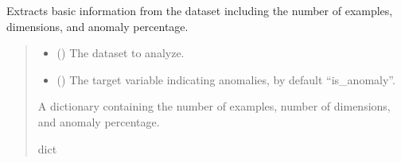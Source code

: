 \documentclass[letterpaper,10pt,english]{sphinxmanual}
\begin{document}
\begin{fulllineitems}
\label{\detokenize{modules:domain.services.metrics.file_info}}
\pysigstartsignatures
{}
\pysigstopsignatures
\sphinxAtStartPar
Extracts basic information from the dataset including the number of examples, dimensions, and anomaly percentage.
\begin{quote}\begin{description}
\begin{itemize}
\item {} 
\sphinxAtStartPar
{} () \textendash{} The dataset to analyze.

\item {} 
\sphinxAtStartPar
{} (\sphinxstyleliteralemphasis{\sphinxupquote{, }}) \textendash{} The target variable indicating anomalies, by default “is\_anomaly”.

\end{itemize}

\sphinxAtStartPar
A dictionary containing the number of examples, number of dimensions, and anomaly percentage.

\sphinxAtStartPar
dict

\end{description}\end{quote}

\end{fulllineitems}

\end{document}
